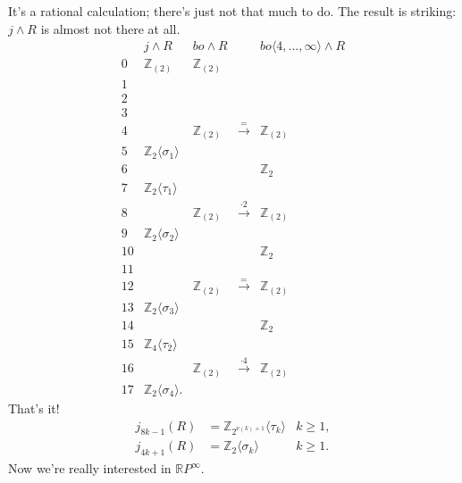 \documentclass{article}
\newcommand{\Z}{\mathbb{Z}}
\newcommand{\R}{\mathbb{R}}
\newcommand{\RP}{\R P}
\newcommand{\sprod}{\wedge}
\begin{document}
It's a rational calculation; there's just not that much to do.  The result is striking: $j \sprod R$ is almost not there at all.
\[
\begin{array}{ccccc}
& j \sprod R & bo \sprod R & & bo \langle 4, \ldots, \infty \rangle \sprod R \\
0 & \Z_{(2)} & \Z_{(2)} \\
1 \\
2 \\
3 \\
4 & & \Z_{(2)} & \stackrel{=}{\to} & \Z_{(2)} \\
5 & \Z_2 \langle \sigma_1 \rangle \\
6 & & & & \Z_2 \\
7 & \Z_2 \langle \tau_1 \rangle \\
8 & & \Z_{(2)} & \stackrel{\cdot 2}{\to} & \Z_{(2)} \\
9 & \Z_2 \langle \sigma_2 \rangle \\
10 & & & & \Z_2 \\
11 \\
12 & & \Z_{(2)} & \stackrel{=}{\to} & \Z_{(2)} \\
13 & \Z_2 \langle \sigma_3 \rangle \\
14 & & & & \Z_2 \\
15 & \Z_4 \langle \tau_2 \rangle \\
16 & & \Z_{(2)} & \stackrel{\cdot 4}{\to} & \Z_{(2)} \\
17 & \Z_2 \langle \sigma_4 \rangle.
\end{array}
\]
That's it!
\begin{align*}
j_{8k-1}(R) & = \Z_{2^{\nu(k)+1}} \langle \tau_k \rangle & k \ge 1, \\
j_{4k+1}(R) & = \Z_2 \langle \sigma_k \rangle & k \ge 1.
\end{align*}
Now we're really interested in $\RP^\infty$.
\end{document}
